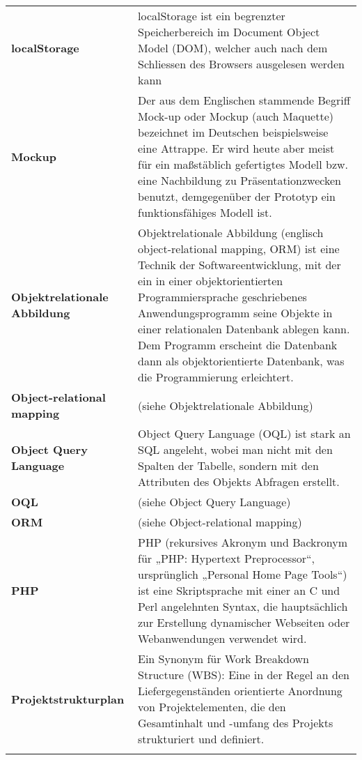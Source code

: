\begin{longtable}{>{\raggedright}m{3cm}m{11cm}}
	\textbf{localStorage}&
	localStorage ist ein begrenzter Speicherbereich im Document Object Model (DOM), welcher auch nach dem Schliessen des Browsers ausgelesen werden kann\\ \addlinespace

	\textbf{Mockup}&
	Der aus dem Englischen stammende Begriff Mock-up oder Mockup (auch Maquette) bezeichnet im Deutschen beispielsweise eine Attrappe. Er wird heute aber meist für ein maßstäblich gefertigtes Modell bzw. eine Nachbildung zu Präsentationzwecken benutzt, demgegenüber der Prototyp ein funktionsfähiges Modell ist.\cite{wiki_mockup}\\ \addlinespace

	\textbf{Objektrelationale Abbildung}&
	Objektrelationale Abbildung (englisch object-relational mapping, ORM) ist eine Technik der Softwareentwicklung, mit der ein in einer objektorientierten Programmiersprache geschriebenes Anwendungsprogramm seine Objekte in einer relationalen Datenbank ablegen kann. Dem Programm erscheint die Datenbank dann als objektorientierte Datenbank, was die Programmierung erleichtert. \cite{wiki_orm}\\ \addlinespace

	\textbf{Object-relational mapping}&
	(siehe Objektrelationale Abbildung)\\ \addlinespace

	\textbf{Object Query Language}&
	Object Query Language (OQL) ist stark an SQL angeleht, wobei man nicht mit den Spalten der Tabelle, sondern mit den Attributen des Objekts Abfragen erstellt.\\ \addlinespace

	\textbf{OQL}&
	(siehe Object Query Language)\\ \addlinespace

	\textbf{ORM}&
	(siehe Object-relational mapping)\\ \addlinespace

	\textbf{PHP}&
	PHP (rekursives Akronym und Backronym für „PHP: Hypertext Preprocessor“, ursprünglich „Personal Home Page Tools“) ist eine Skriptsprache mit einer an C und Perl angelehnten Syntax, die hauptsächlich zur Erstellung dynamischer Webseiten oder Webanwendungen verwendet wird.\cite{wiki_php}\\ \addlinespace

	\textbf{Projektstrukturplan}&
	Ein Synonym für Work Breakdown Structure (WBS): Eine in der Regel an den Liefergegenständen orientierte Anordnung von Projektelementen, die den Gesamtinhalt und -umfang des Projekts strukturiert und definiert.\cite{proj_mgmt_book}\\ \addlinespace


\end{longtable}
